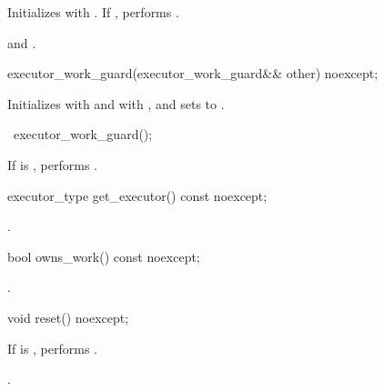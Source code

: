 \begin{itemdescr}
\pnum
\effects Initializes  with . If , performs .

\pnum
\postconditions {} and .
\end{itemdescr}

%
\begin{itemdecl}
executor_work_guard(executor_work_guard&& other) noexcept;
\end{itemdecl}

\begin{itemdescr}
\pnum
\effects Initializes  with  and  with , and sets  to .
\end{itemdescr}

%
\begin{itemdecl}
~executor_work_guard();
\end{itemdecl}

\begin{itemdescr}
\pnum
\effects If  is , performs .
\end{itemdescr}

%
\begin{itemdecl}
executor_type get_executor() const noexcept;
\end{itemdecl}

\begin{itemdescr}
\pnum
\returns {}.
\end{itemdescr}

%
\begin{itemdecl}
bool owns_work() const noexcept;
\end{itemdecl}

\begin{itemdescr}
\pnum
\returns {}.
\end{itemdescr}

%
\begin{itemdecl}
void reset() noexcept;
\end{itemdecl}

\begin{itemdescr}
\pnum
\effects If  is , performs .

\pnum
\postconditions {}.
\end{itemdescr}




